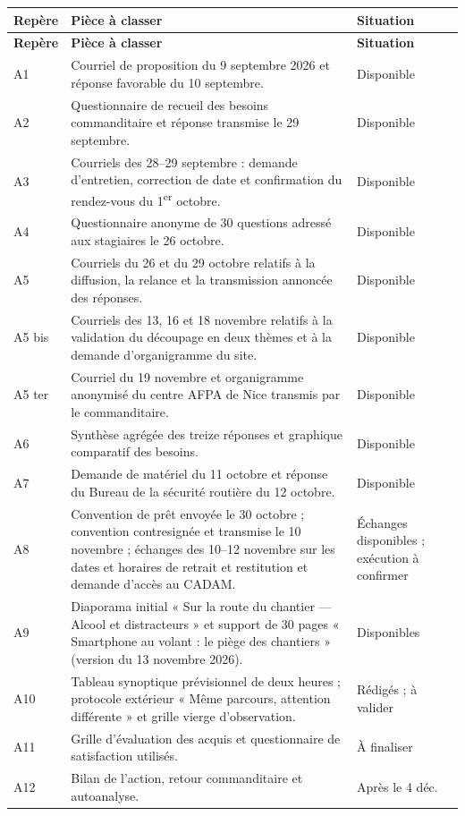 \begin{longtable}{@{}p{}p{}p{}@{}}
\toprule
\textbf{Repère} & \textbf{Pièce à classer} & \textbf{Situation} \\
\midrule
\endfirsthead
\toprule \textbf{Repère} & \textbf{Pièce à classer} & \textbf{Situation} \\ \midrule
\endhead
A1 & Courriel de proposition du 9 septembre 2026 et réponse favorable du 10 septembre. & Disponible \\
A2 & Questionnaire de recueil des besoins commanditaire et réponse transmise le 29 septembre. & Disponible \\
A3 & Courriels des 28--29 septembre : demande d'entretien, correction de date et confirmation du rendez-vous du 1\textsuperscript{er} octobre. & Disponible \\
A4 & Questionnaire anonyme de 30 questions adressé aux stagiaires le 26 octobre. & Disponible \\
A5 & Courriels du 26 et du 29 octobre relatifs à la diffusion, la relance et la transmission annoncée des réponses. & Disponible \\
A5 bis & Courriels des 13, 16 et 18 novembre relatifs à la validation du découpage en deux thèmes et à la demande d'organigramme du site. & Disponible \\
A5 ter & Courriel du 19 novembre et organigramme anonymisé du centre AFPA de Nice transmis par le commanditaire. & Disponible \\
A6 & Synthèse agrégée des treize réponses et graphique comparatif des besoins. & Disponible \\
A7 & Demande de matériel du 11 octobre et réponse du Bureau de la sécurité routière du 12 octobre. & Disponible \\
A8 & Convention de prêt envoyée le 30 octobre ; convention contresignée et transmise le 10 novembre ; échanges des 10--12 novembre sur les dates et horaires de retrait et restitution et demande d'accès au CADAM. & Échanges disponibles ; exécution à confirmer \\
A9 & Diaporama initial « Sur la route du chantier --- Alcool et distracteurs » et support de 30 pages « Smartphone au volant : le piège des chantiers » (version du 13 novembre 2026). & Disponibles \\
A10 & Tableau synoptique prévisionnel de deux heures ; protocole extérieur « Même parcours, attention différente » et grille vierge d’observation. & Rédigés ; à valider \\
A11 & Grille d'évaluation des acquis et questionnaire de satisfaction utilisés. & À finaliser \\
A12 & Bilan de l'action, retour commanditaire et autoanalyse. & Après le 4 déc. \\
\bottomrule
\end{longtable}



